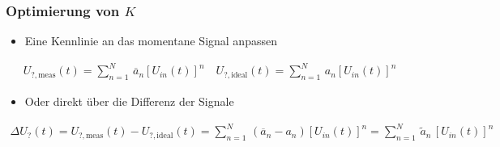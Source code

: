 \begin{frame}[fragile]
\frametitle{Optimierung von $K$}

\begin{itemize}
  \item Eine Kennlinie an das momentane Signal anpassen
\end{itemize}

\begin{align}
	U_{?, \mathrm{meas}} (t) = \sum_{n=1}^N \, \overline{a}_n \left[ U_{in}(t)\right]^n
	\quad
	U_{?, \mathrm{ideal}} (t) = \sum_{n=1}^N \, a_n \left[ U_{in}(t) \right]^n
\end{align}
\begin{itemize}
  \item Oder direkt über die Differenz der Signale
\end{itemize}
\begin{align}
	\Delta U_? (t) = U_{?, \mathrm{meas}} (t) - U_{?, \mathrm{ideal}} (t)
	=
	\sum_{n=1}^N \, \left( \overline{a}_n -  a_n\right) \left[ U_{in}(t) \right]^n
	=
	\sum_{n=1}^N \, \tilde{a}_n \, \left[ U_{in}(t) \right]^n
\end{align}
\end{frame}

